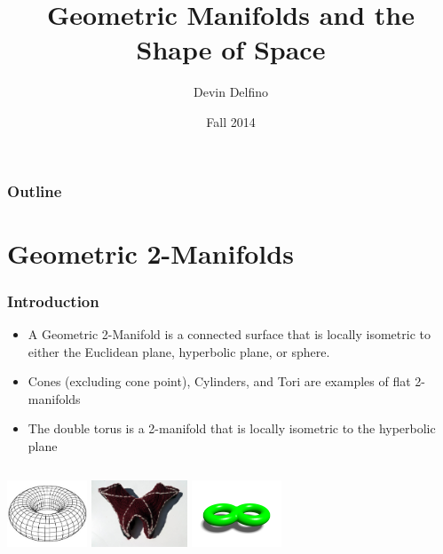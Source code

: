 \documentclass[13pt]{beamer}
\title{Geometric Manifolds and the Shape of Space}
\author{Devin Delfino}
\institute{MATH 331: Geometry}
\date{Fall 2014}
\begin{document}
\frame{\titlepage}

\begin{frame}
\frametitle{Outline}
\tableofcontents
\end{frame}

\section{Geometric 2-Manifolds} %
\begin{frame}
\frametitle{Introduction}
	\begin{itemize}
		\item A \alert{Geometric 2-Manifold} is a connected surface that is locally isometric to either the Euclidean plane, hyperbolic plane, or sphere.
		\item Cones (excluding cone point), Cylinders, and Tori are examples of flat 2-manifolds
    \item The double torus is a 2-manifold that is locally isometric to the hyperbolic plane
	\end{itemize}
	\begin{columns}[r] %
     \centering
     \includegraphics[height=2cm]{./img/torus}
     \centering
     \includegraphics[height=2cm]{./img/hyperbolicpants}
     \centering
     \includegraphics[height=2cm]{./img/doubletorus}
  \end{columns}
\end{frame}
\end{document}
